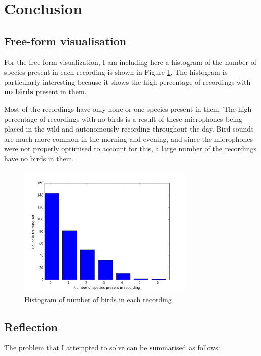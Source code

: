 \documentclass[11pt]{article}
\begin{document}
\section{Conclusion}

\subsection{Free-form visualisation}
For the free-form visualization, I am including here a histogram of the number of species present in each recording is shown in Figure \ref{bird_species_histogram}. The histogram is particularly interesting because it shows the high percentage of recordings with \textbf{no birds} present in them.

Most of the recordings have only none or one species present in them. The high percentage of recordings with no birds is a result of these microphones being placed in the wild and autonomously recording throughout the day. Bird sounds are much more common in the morning and evening, and since the microphones were not properly optimised to account for this, a large number of the recordings have no birds in them.

\begin{figure}[h]
\begin{center}
\includegraphics[width=0.75\textwidth]{../n_species_stats.png}
\caption{Histogram of number of birds in each recording}
\label{bird_species_histogram}
\end{center}
\end{figure}

\subsection{Reflection}

The problem that I attempted to solve can be summarised as follows: 
\end{document}
